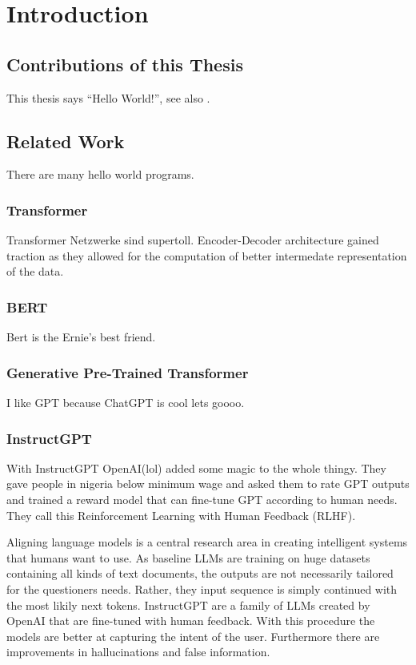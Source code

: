 \documentclass[english, version-2022-01]{uzl-thesis}
\begin{document}
\chapter{Introduction}
\section{Contributions of this Thesis}
This thesis says ``Hello World!'', see also \cite{Kernighan1974}.
\section{Related Work}
There are many hello world programs.

\subsection{Transformer}
Transformer Netzwerke sind supertoll. Encoder-Decoder architecture gained traction as they allowed for the computation of better intermedate representation of the data.

\subsection{BERT}
Bert is the Ernie's best friend.

\subsection{Generative Pre-Trained Transformer}
I like GPT because ChatGPT is cool lets goooo.

\subsection{InstructGPT}
With InstructGPT OpenAI(lol) added some magic to the whole thingy. They gave people in nigeria below minimum wage and asked them to rate GPT outputs and trained a reward model that can fine-tune GPT according to human needs. They call this Reinforcement Learning with Human Feedback (RLHF).

Aligning language models is a central research area in creating intelligent systems that humans want to use. As baseline LLMs are training on huge datasets containing all kinds of text documents, the outputs are not necessarily tailored for the questioners needs.
Rather, they input sequence is simply continued with the most likily next tokens. InstructGPT are a family of LLMs created by OpenAI that are fine-tuned with human feedback. With this procedure the models are better at capturing the intent of the user. Furthermore there are improvements in hallucinations and false information.
\end{document}
